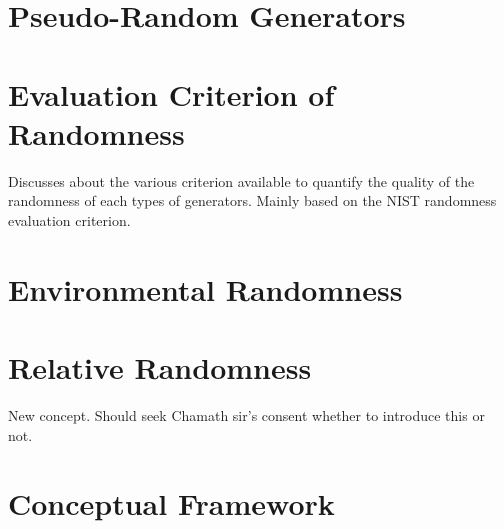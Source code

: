 \section{Pseudo-Random Generators}

\section{Evaluation Criterion of Randomness}

Discusses about the various criterion available to quantify the quality of the randomness of each types of generators. Mainly based on the NIST randomness evaluation criterion.

\section{Environmental Randomness}

\section{Relative Randomness}

New concept. Should seek Chamath sir's consent whether to introduce this or not.

\section{Conceptual Framework}